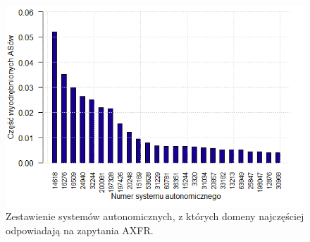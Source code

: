 \begin{figure}[ht]
	\centering
	\includegraphics[width=1.0\textwidth]{image/asn_all_no_title}
	\caption{Zestawienie systemów autonomicznych, z których domeny najczęściej odpowiadają na zapytania AXFR.}
	\label{fig:asn_all}
\end{figure}

